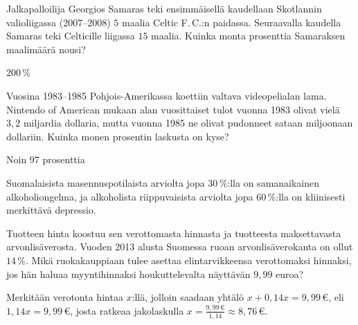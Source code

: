 \begin{tehtavasivu}
\begin{tehtava}
    Jalkapalloilija Georgios Samaras teki ensimmäisellä kaudellaan Skotlannin valioliigassa (2007--2008) $5$ maalia Celtic F.\,C.:n paidassa. Seuraavalla kaudella Samaras teki Celticille liigassa $15$ maalia. Kuinka monta prosenttia Samaraksen maalimäärä nousi?
    \begin{vastaus}
        $200\,\%$
    \end{vastaus}
\end{tehtava}

\begin{tehtava}
Vuosina 1983--1985 Pohjois-Amerikassa koettiin valtava videopelialan lama. Nintendo of American mukaan alan vuosittaiset tulot vuonna 1983 olivat vielä $3,2$ miljardia dollaria, mutta vuonna 1985 ne olivat pudonneet sataan miljoonaan dollariin. Kuinka monen prosentin laskusta on kyse?
	\begin{vastaus}
Noin $97$ prosenttia
	\end{vastaus}
\end{tehtava}

\begin{tehtava}
Suomalaisista masennuspotilaista arviolta jopa $30$\,\%:lla on samanaikainen alkoholiongelma, ja alkoholista riippuvaisista arviolta jopa $60$\,\%:lla on kliinisesti merkittävä depressio.
	\begin{vastaus}
	\end{vastaus}
\end{tehtava}

\begin{tehtava} %
Tuotteen hinta koostuu sen verottomasta hinnasta ja tuotteesta maksettavasta arvonlisäverosta. Vuoden 2013 alusta Suomessa ruoan arvonlisäverokanta on ollut $14\,\%$. Mikä ruokakauppiaan tulee asettaa elintarvikkeensa verottomaksi hinnaksi, jos hän haluaa myyntihinnaksi houkuttelevalta näyttävän $9,99$ euroa?
	\begin{vastaus}
	Merkitään verotonta hintaa $x$:llä, jolloin saadaan yhtälö $x+0,14x=9,99\,€$, eli $1,14x=9,99\,€$, josta ratkeaa jakolaskulla $x=\frac{9,99\,€}{1,14}\approx 8,76\,€$. 
	\end{vastaus}
\end{tehtava}


\end{tehtavasivu}
